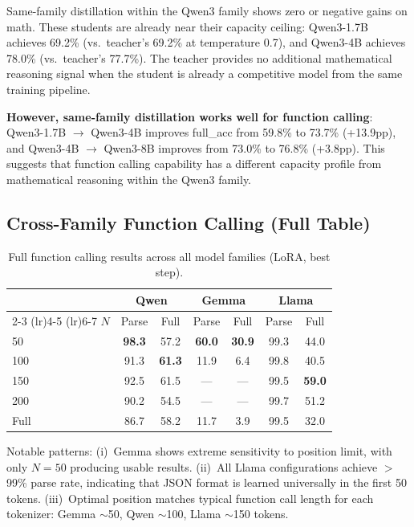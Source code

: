 \documentclass[10pt]{article}
\begin{document}
Same-family distillation within the Qwen3 family shows zero or negative gains on math.
These students are already near their capacity ceiling: Qwen3-1.7B achieves 69.2\% (vs.\ teacher's 69.2\% at temperature 0.7), and Qwen3-4B achieves 78.0\% (vs.\ teacher's 77.7\%).
The teacher provides no additional mathematical reasoning signal when the student is already a competitive model from the same training pipeline.

\textbf{However, same-family distillation works well for function calling}: Qwen3-1.7B $\to$ Qwen3-4B improves full\_acc from 59.8\% to 73.7\% (+13.9pp), and Qwen3-4B $\to$ Qwen3-8B improves from 73.0\% to 76.8\% (+3.8pp).
This suggests that function calling capability has a different capacity profile from mathematical reasoning within the Qwen3 family.

\subsection{Cross-Family Function Calling (Full Table)}

\begin{table}[h]
\centering
\caption{Full function calling results across all model families (LoRA, best step).}
\small
\begin{tabular}{@{}lcccccc@{}}
\toprule
& \multicolumn{2}{c}{\textbf{Qwen}} & \multicolumn{2}{c}{\textbf{Gemma}} & \multicolumn{2}{c}{\textbf{Llama}} \\
\cmidrule(lr){2-3} \cmidrule(lr){4-5} \cmidrule(lr){6-7}
$N$ & Parse & Full & Parse & Full & Parse & Full \\
\midrule
50   & \textbf{98.3} & 57.2 & \textbf{60.0} & \textbf{30.9} & 99.3 & 44.0 \\
100  & 91.3 & \textbf{61.3} & 11.9 & 6.4  & 99.8 & 40.5 \\
150  & 92.5 & 61.5 & --- & ---  & 99.5 & \textbf{59.0} \\
200  & 90.2 & 54.5 & --- & ---  & 99.7 & 51.2 \\
Full & 86.7 & 58.2 & 11.7 & 3.9  & 99.5 & 32.0 \\
\bottomrule
\end{tabular}
\end{table}

Notable patterns: (i)~Gemma shows extreme sensitivity to position limit, with only $N=50$ producing usable results. (ii)~All Llama configurations achieve $>$99\% parse rate, indicating that JSON format is learned universally in the first 50 tokens. (iii)~Optimal position matches typical function call length for each tokenizer: Gemma $\sim$50, Qwen $\sim$100, Llama $\sim$150 tokens.
\end{document}
